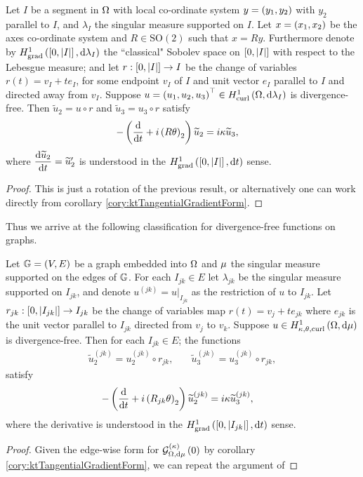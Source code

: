 \begin{prop} \label{prop:DivFreeGeneralSegment}
	Let $I$ be a segment in $\Omega$ with local co-ordinate system $y=\left( y_1,y_2 \right)$ with $y_2$ parallel to $I$, and $\lambda_I$ the singular measure supported on $I$.
	Let $x=\left( x_1,x_2 \right)$ be the axes co-ordinate system and $R\in\mathrm{SO}(2)$ such that $x=Ry$.
	Furthermore denote by $H^1_\mathrm{grad}\left( \left[ 0,\left\lvert I \right\rvert \right], \mathrm{d}\lambda_I \right)$ the ``classical" Sobolev space on $\left[ 0,\left\lvert I \right\rvert \right]$ with respect to the Lebesgue measure; and let $r:\left[ 0,\left\lvert I \right\rvert \right]\rightarrow I$ be the change of variables $r(t)= v_I + t e_I$, for some endpoint $v_I$ of $I$ and unit vector $e_I$ parallel to $I$ and directed away from $v_I$.
	Suppose $u=\left( u_1, u_2, u_3 \right)^\top\in H^1_\mathrm{curl}\left( \Omega, \mathrm{d}\lambda_I \right)$ is divergence-free.
	Then $\widetilde{u}_2 = u \circ r$ and $\widetilde{u}_3 = u_3 \circ r$ satisfy
	\begin{align*}
		-\left( \dfrac{\mathrm{d}}{\mathrm{d}t} + i\left( R\theta \right)_2 \right)\widetilde{u}_2 &= i\kappa\widetilde{u}_3,
	\end{align*}
	where $\dfrac{\mathrm{d}\widetilde{u}_2}{\mathrm{d}t} = \widetilde{u}'_2$ is understood in the $H^1_\mathrm{grad}\left( \left[ 0,\left\lvert I \right\rvert \right], \mathrm{d}t \right)$ sense.
\end{prop}
\begin{proof}
	This is just a rotation of the previous result, or alternatively one can work directly from corollary \ref{cory:ktTangentialGradientForm}.
\end{proof}

Thus we arrive at the following classification for divergence-free functions on graphs.
\begin{cory} \label{cory:DivFreeWholeGraph}
	Let $\mathbb{G}=\left( V,E \right)$ be a graph embedded into $\Omega$ and $\mu$ the singular measure supported on the edges of $\mathbb{G}$.
	For each $I_{jk}\in E$ let $\lambda_{jk}$ be the singular measure supported on $I_{jk}$, and denote $u^{(jk)} = u\vert_{I_{jk}}$ as the restriction of $u$ to $I_{jk}$.
	Let $r_{jk}:\left[ 0,\left\lvert I_{jk} \right\rvert \right]\rightarrow I_{jk}$ be the change of variables map $r(t)=v_{j} + te_{jk}$ where $e_{jk}$ is the unit vector parallel to $I_{jk}$ directed from $v_j$ to $v_k$.
	Suppose $u\in H^1_{\kappa,\theta,\mathrm{curl}}\left( \Omega, \mathrm{d}\mu \right)$ is divergence-free.
	Then for each $I_{jk}\in E$; the functions 
	\begin{align*}
		\widetilde{u}^{(jk)}_2 = u^{(jk)}_2 \circ r_{jk},
		&\quad \widetilde{u}^{(jk)}_3 = u^{(jk)}_3 \circ r_{jk},
	\end{align*}
	satisfy 
	\begin{align*}
		-\left( \dfrac{\mathrm{d}}{\mathrm{d}t} + i\left( R_{jk}\theta \right)_2 \right)\widetilde{u}^{(jk)}_2 &= i\kappa\widetilde{u}^{(jk)}_3,
	\end{align*}
	where the derivative is understood in the $H^1_\mathrm{grad}\left( \left[ 0,\left\lvert I_{jk} \right\rvert \right], \mathrm{d}t \right)$ sense.
\end{cory}
\begin{proof}
	Given the edge-wise form for $\mathcal{G}_{ \Omega, \mathrm{d}\mu}^{(\kappa)}\left( 0 \right)$ by corollary \ref{cory:ktTangentialGradientForm}, we can repeat the argument of 
\end{proof}

